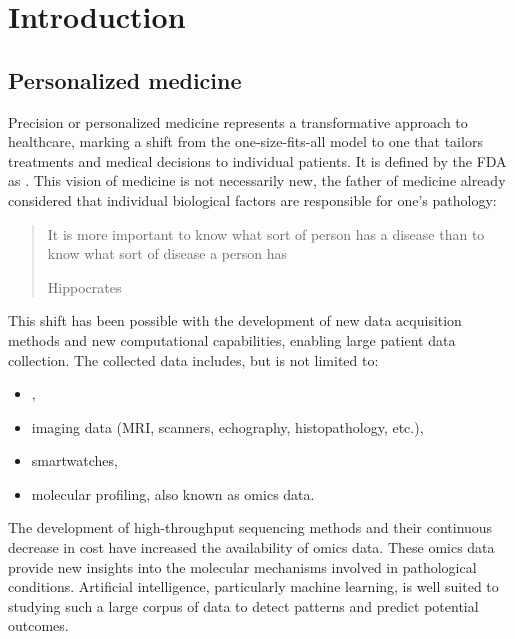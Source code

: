 \documentclass[../main.tex]{subfiles}
\begin{document}

\chapter{Introduction}
\minitoc\vspace{-1em}

\section{Personalized medicine}
	Precision or personalized medicine represents a transformative approach to healthcare, marking a shift from the one-size-fits-all model to one that tailors treatments and medical decisions to individual patients.
	It is defined by the FDA as .
	This vision of medicine is not necessarily new, the father of medicine already considered that individual biological factors are responsible for one's pathology: \blockquote[Hippocrates][.]{It is more important to know what sort of person has a disease than to know what sort of disease a person has}.
	This shift has been possible with the development of new data acquisition methods and new computational capabilities, enabling large patient data collection.
	The collected data includes, but is not limited to:
	\begin{itemize}[nosep]
		\item {},
		\item imaging data (MRI, scanners, echography, histopathology, etc.),
		\item smartwatches,
		\item molecular profiling, also known as omics data.
	\end{itemize}
	The development of high-throughput sequencing methods and their continuous decrease in cost have increased the availability of omics data.
	These omics data provide new insights into the molecular mechanisms involved in pathological conditions.
	Artificial intelligence, particularly machine learning, is well suited to studying such a large corpus of data to detect patterns and predict potential outcomes.
\end{document}
